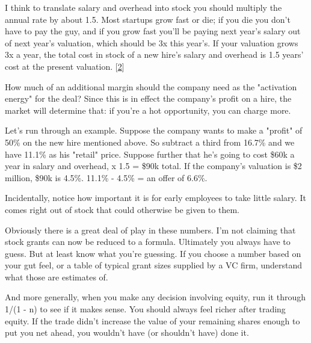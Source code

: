 I think to translate salary and overhead
                  into stock you should multiply the annual rate by about 1.5.
                  Most startups grow fast or die; if you die you don't have to
                  pay the guy, and if you grow fast you'll be paying next year's
                  salary out of next year's valuation, which should be 3x this
                  year's. If your valuation grows 3x a year, the total cost in
                  stock of a new hire's salary and overhead is 1.5 years' cost
                  at the present valuation.
                  [\href{\#f2n}{2}]

How much of an additional margin should the
                  company need as the "activation energy" for the deal? Since
                  this is in effect the company's profit on a hire, the market
                  will determine that: if you're a hot opportunity, you can
                  charge more.

Let's run through an example. Suppose
                  the company wants to make a "profit" of 50\% on the new hire
                  mentioned above. So subtract a third from 16.7\% and we have
                  11.1\% as his "retail" price. Suppose further that he's going
                  to cost \$60k a year in salary and overhead, x 1.5 = \$90k
                  total. If the company's valuation is \$2 million, \$90k is 4.5\%.
                  11.1\% - 4.5\% = an offer of 6.6\%.

Incidentally,
                  notice how important it is for early employees to take little
                  salary. It comes right out of stock that could otherwise be
                  given to them.

Obviously there is a great deal of
                  play in these numbers. I'm not claiming that stock grants can
                  now be reduced to a formula. Ultimately you always have to
                  guess. But at least know what you're guessing. If you choose a
                  number based on your gut feel, or a table of typical grant
                  sizes supplied by a VC firm, understand what those are
                  estimates of.

And more generally, when you make any
                  decision involving equity, run it through 1/(1 - n) to see if
                  it makes sense. You should always feel richer after trading
                  equity. If the trade didn't increase the value of your
                  remaining shares enough to put you net ahead, you wouldn't
                  have (or shouldn't have) done it.



